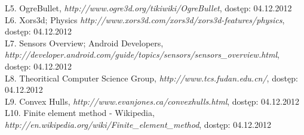 L5. OgreBullet, \emph{http://www.ogre3d.org/tikiwiki/OgreBullet}, dostęp:
04.12.2012\\

L6. Xors3d; Physics
\emph{http://www.xors3d.com/xors3d/xors3d-features/physics}, dostęp:
04.12.2012\\

L7. Sensors Overview; Android Developers,
\emph{http://developer.android.com/guide/topics/sensors/sensors\_overview.html},
dostęp: 04.12.2012\\

L8. Theoritical Computer Science Group, \emph{http://www.tcs.fudan.edu.cn/},
dostęp: 04.12.2012\\

L9. Convex Hulls, \emph{http://www.evanjones.ca/convexhulls.html}, dostęp:
04.12.2012\\

L10. Finite element
method - Wikipedia, \emph{http://en.wikipedia.org/wiki/Finite\_element\_method},
dostęp:
04.12.2012\\